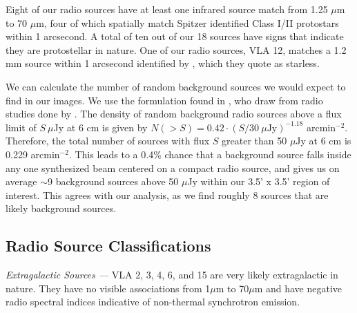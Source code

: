 \documentclass[apj]{emulateapj}
\begin{document}
Eight of our radio sources have at least one infrared source match from 1.25 $\mu$m to 70 $\mu$m, four of which spatially match Spitzer identified Class I/II protostars within 1 arcsecond. A total of ten out of our 18 sources have signs that indicate they are protostellar in nature. One of our radio sources, VLA 12, matches a 1.2 mm source within 1 arcsecond identified by \citep{Maury11}, which they quote as starless.

We can calculate the number of random background sources we would expect to find in our images. We use the formulation found in \citet{Shirley07}, who draw from radio studies done by \citet{Fomalont91}. The density of random background radio sources above a flux limit of $S\ \mu$Jy at 6 cm is given by $N(>S) = 0.42\cdot(S/30\ \mu \text{Jy})^{-1.18}$ arcmin$^{-2}$. Therefore, the total number of sources with flux $S$ greater than 50 $\mu$Jy at 6 cm is 0.229 arcmin$^{-2}$. This leads to a 0.4\% chance that a background source falls inside any one synthesized beam centered on a compact radio source, and gives us on average $\sim$9 background sources above 50 $\mu$Jy within our 3.5' x 3.5' region of interest. This agrees with our analysis, as we find roughly 8 sources that are likely background sources.


%
%


\subsection{Radio Source Classifications}
\label{sec:radio source classifications}

\newcommand{\sourcenote}[1]{\textit{#1 ---}}

\sourcenote{Extragalactic Sources}
VLA 2, 3, 4, 6, and 15 are very likely extragalactic in nature. They have no visible associations from 1$\mu$m to 70$\mu$m and have negative radio spectral indices indicative of non-thermal synchrotron emission. 
\end{document}
